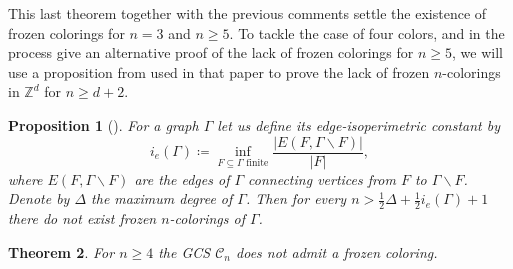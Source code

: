 \documentclass[cupthm,crop,info]{CUP-JNL-ETS}%
\theoremstyle{cupplain}
\newtheorem{theorem}{Theorem}[section]
\newtheorem{proposition}[theorem]{Proposition}
\theoremstyle{cupdefinition}
\theoremstyle{cupremark}
\theoremstyle{cupproof}
\numberwithin{equation}{section}
\begin{document}
This last theorem together with the previous comments settle the existence of frozen colorings for $n=3$ and $n\ge 5$. To tackle the case of four colors, and in the process give an alternative proof of the lack of frozen colorings for $n\ge 5$, we will use a proposition from \cite{alon2019mixing} used in that paper to prove the lack of frozen $n$-colorings in $\mathbb{Z}^d$ for $n\ge d+2$.

\begin{proposition}[{\cite[Proposition~2.2]{alon2019mixing}}]\label{prop:nofroz_graph} For a graph $\Gamma$ let us define its \textit{edge-isoperimetric constant} by
	$$
	i_e(\Gamma)\coloneqq \inf_{F\subseteq \Gamma \text{ finite}}\frac{|E(F,\Gamma\backslash F)|}{|F|},
	$$
	where $E(F,\Gamma\backslash F)$ are the edges of $\Gamma$ connecting vertices from $F$ to $\Gamma\backslash F$. Denote by $\Delta$ the maximum degree of $\Gamma$. Then for every $n>\frac{1}{2}\Delta+\frac{1}{2}i_e(\Gamma)+1$ there do not exist frozen $n$-colorings of $\Gamma$.
\end{proposition}
\begin{theorem}\label{thm:no_frozen_n_ge_4} For $n\ge 4$ the GCS $\mathcal{C}_n$ does not admit a frozen coloring.
\end{theorem}
\end{document}
